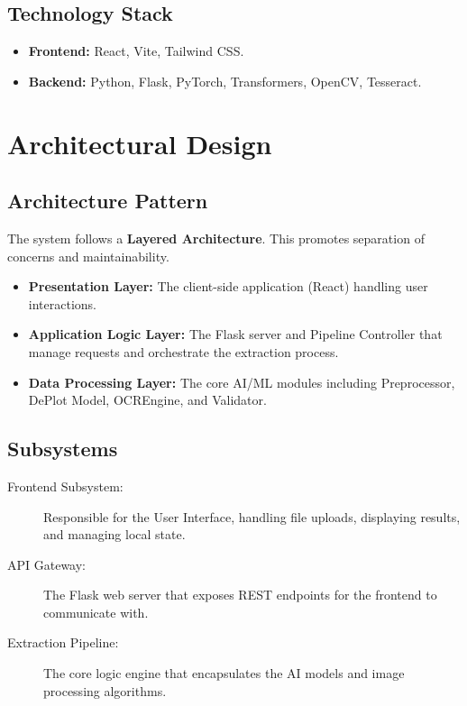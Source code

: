 \documentclass[12pt, a4paper]{article}
\begin{document}
\subsection{Technology Stack}
\begin{itemize}
    \item \textbf{Frontend:} React, Vite, Tailwind CSS.
    \item \textbf{Backend:} Python, Flask, PyTorch, Transformers, OpenCV, Tesseract.
\end{itemize}

\section{Architectural Design}

\subsection{Architecture Pattern}
The system follows a \textbf{Layered Architecture}. This promotes separation of concerns and maintainability.
\begin{itemize}
    \item \textbf{Presentation Layer:} The client-side application (React) handling user interactions.
    \item \textbf{Application Logic Layer:} The Flask server and Pipeline Controller that manage requests and orchestrate the extraction process.
    \item \textbf{Data Processing Layer:} The core AI/ML modules including Preprocessor, DePlot Model, OCREngine, and Validator.
\end{itemize}

\subsection{Subsystems}
\begin{description}
    \item[Frontend Subsystem:] Responsible for the User Interface, handling file uploads, displaying results, and managing local state.
    \item[API Gateway:] The Flask web server that exposes REST endpoints for the frontend to communicate with.
    \item[Extraction Pipeline:] The core logic engine that encapsulates the AI models and image processing algorithms.
\end{description}
\end{document}
